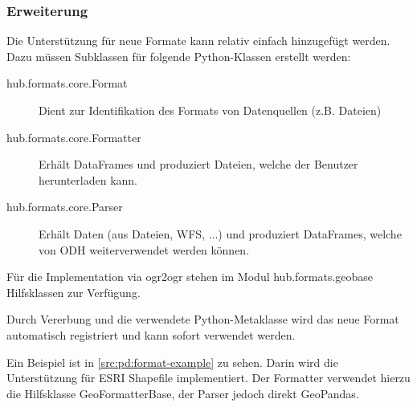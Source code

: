 \subsubsection{Erweiterung}
Die Unterstützung für neue Formate kann relativ einfach hinzugefügt werden. Dazu müssen Subklassen für folgende Python-Klassen erstellt werden:

\begin{description}
\item[hub.formats.core.Format] Dient zur Identifikation des Formats von Datenquellen (z.B. Dateien)
\item[hub.formats.core.Formatter] Erhält DataFrames und produziert Dateien, welche der Benutzer herunterladen kann.
\item[hub.formats.core.Parser] Erhält Daten (aus Dateien, WFS, ...) und produziert DataFrames, welche von ODH weiterverwendet werden können.
\end{description}

Für die Implementation via ogr2ogr stehen im Modul hub.formats.geobase Hilfsklassen zur Verfügung.

Durch Vererbung und die verwendete Python-Metaklasse wird das neue Format automatisch registriert und kann sofort verwendet werden.

Ein Beispiel ist in \cref{src:pd:format-example} zu sehen. Darin wird die Unterstützung für ESRI Shapefile implementiert. Der Formatter verwendet hierzu die Hilfsklasse GeoFormatterBase, der Parser jedoch direkt GeoPandas.

